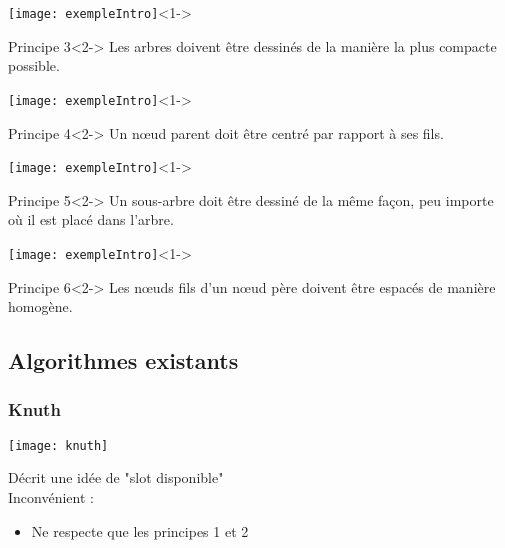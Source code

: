 \begin{frame}
	\begin{center}	
		\texttt{[image: exempleIntro]}<1->\\
		\begin{block}{Principe 3}<2->
		Les arbres doivent être dessinés de la manière la plus compacte possible.
		\end{block}
	\end{center}
\end{frame}

\begin{frame}
	\begin{center}	
		\texttt{[image: exempleIntro]}<1->\\
		\begin{block}{Principe 4}<2->
		Un n\oe{}ud parent doit être centré par rapport à ses fils.
		\end{block}
	\end{center}
\end{frame}

\begin{frame}
	\begin{center}	
		\texttt{[image: exempleIntro]}<1->\\
		\begin{block}{Principe 5}<2->
		Un sous-arbre doit être dessiné de la même façon, peu importe où il est placé dans l'arbre.
		\end{block}
	\end{center}
\end{frame}

\begin{frame}
	\begin{center}	
		\texttt{[image: exempleIntro]}<1->\\
		\begin{block}{Principe 6}<2->
		Les n\oe{}uds fils d'un n\oe{}ud père doivent être espacés de manière homogène.
		\end{block}
	\end{center}
\end{frame}

\subsection{Algorithmes existants}

\begin{frame}
	\frametitle{Knuth}
	\begin{center}
	\texttt{[image: knuth]}
	\end{center}
	Décrit une idée de "slot disponible"\\
	Inconvénient :
	\begin{itemize}
		\item Ne respecte que les principes 1 et 2
	\end{itemize}
\end{frame}

